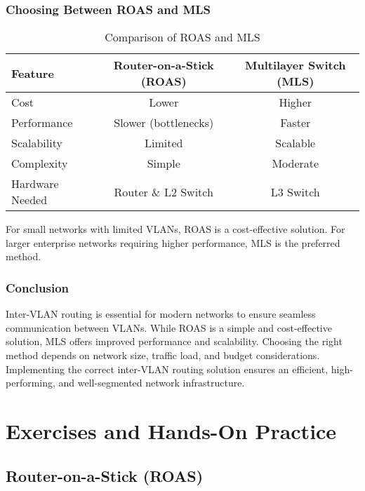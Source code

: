 \documentclass[a4paper]{book}
\begin{document}
\section{Choosing Between ROAS and MLS}
\begin{table}[h]
    \centering
    \begin{tabular}{lcc}
        \toprule
        Feature & Router-on-a-Stick (ROAS) & Multilayer Switch (MLS) \\
        \midrule
        Cost & Lower & Higher \\
        Performance & Slower (bottlenecks) & Faster \\
        Scalability & Limited & Scalable \\
        Complexity & Simple & Moderate \\
        Hardware Needed & Router \& L2 Switch & L3 Switch \\
        \bottomrule
    \end{tabular}
    \caption{Comparison of ROAS and MLS}
    \label{tab:comparison}
\end{table}

For small networks with limited VLANs, ROAS is a cost-effective solution. For larger enterprise networks requiring higher performance, MLS is the preferred method.

\section{Conclusion}
Inter-VLAN routing is essential for modern networks to ensure seamless communication between VLANs. While ROAS is a simple and cost-effective solution, MLS offers improved performance and scalability. Choosing the right method depends on network size, traffic load, and budget considerations. Implementing the correct inter-VLAN routing solution ensures an efficient, high-performing, and well-segmented network infrastructure.


\part{Exercises and Hands-On Practice}

\chapter{Router-on-a-Stick (ROAS)}
\end{document}
